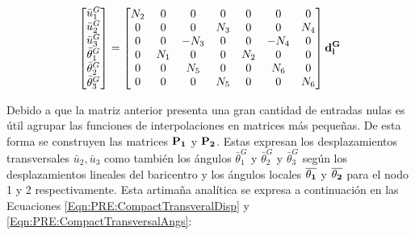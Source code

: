 \begin{equation}\label{Eqn:PRE:LocalDispsTransform}
	\begin{bmatrix}
		\bar{u}_1^G\\
		\bar{u}_2^G\\
		\bar{u}_3^G\\
		 \bar{\theta}_1^G\\
		 \bar{\theta}_2^G\\
		 \bar{\theta}_3^G\\
	\end{bmatrix}
=
\begin{bmatrix}
	N_2 &0  & 0 & 0 & 0 & 0 & 0   \\
	0 & 0 & 0 & N_3 & 0 &0  &N_4  \\
	0& 0 &-N_3  & 0 &0  & -N_4 &0 \\
	0 & N_1 & 0 & 0 &N_2  & 0 &0   \\
	0&0  & N_5 & 0 & 0 & N_6 &0   \\
	0 & 0 & 0 & N_5 & 0 & 0 & N_6   \\
\end{bmatrix} \bf{d_l^G}
\end{equation}

Debido a que la matriz anterior presenta una gran cantidad de entradas nulas es útil agrupar las funciones de interpolaciones en matrices más pequeñas. De esta forma se construyen las matrices $\bf{P_1}$ y $\bf{P_2}$.  Estas expresan los desplazamientos transversales  $\bar{u}_2, \bar{u}_3 $  como también los ángulos $\bar{\theta}_1^G$  y $\bar{\theta}_2^G$ y $\bar{\theta}_3^G$ según los desplazamientos lineales del baricentro y los ángulos locales  $\overline{\bf{\theta_1}}$ y  $\overline{\bf{\theta_2}}$ para el nodo 1 y 2 respectivamente. Esta artimaña analítica se expresa a continuación en las Ecuaciones \eqref{Eqn:PRE:CompactTransveralDisp} y \eqref{Eqn:PRE:CompactTransversalAngs}:


